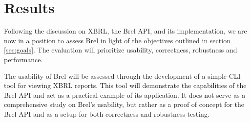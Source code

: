 \chapter{Results}
\label{chapter:results}






Following the discussion on XBRL, the Brel API, and its implementation, 
we are now in a position to assess Brel in light of the objectives outlined in section \ref{sec:goals}. 
The evaluation will prioritize usability, correctness, robustness and performance.

The usability of Brel will be assessed through the development of a simple CLI tool for viewing XBRL reports. 
This tool will demonstrate the capabilities of the Brel API and act as a practical example of its application.
It does not serve as a comprehensive study on Brel's usability, but rather as a proof of concept for the Brel API
and as a setup for both correctness and robustness testing.

